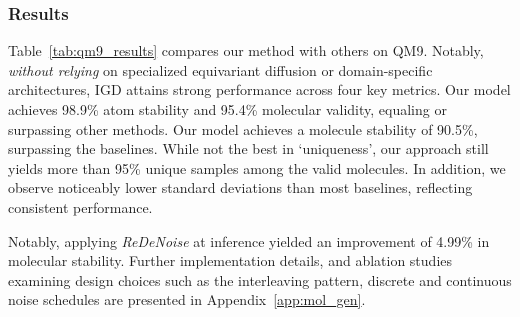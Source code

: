 \subsubsection{Results}
Table~\ref{tab:qm9_results} compares our method with others on QM9. Notably, \emph{without relying} on specialized equivariant diffusion or domain-specific architectures, IGD attains strong performance across four key metrics. Our model achieves 98.9\% atom stability and 95.4\% molecular validity, equaling or surpassing other methods. Our model achieves a molecule stability of 90.5\%, surpassing the baselines. While not the best in `uniqueness', our approach still yields more than 95\% unique samples among the valid molecules. In addition, we observe noticeably lower standard deviations than most baselines, reflecting consistent performance.

Notably, applying \emph{ReDeNoise} at inference yielded an improvement of 4.99\% in molecular stability. Further implementation details, and ablation studies examining design choices such as the interleaving pattern, discrete and continuous noise schedules are presented in Appendix~\ref{app:mol_gen}.


 \begin{table}[t]
     \vspace{-8pt}
    \caption{\textbf{Molecule Generation:} Quantitative results on QM9 benchmark.
    We report mean (standard deviation) across 3 runs, each with 10K generated samples. Refer to section \ref{par:mol_gen_eval_metrics} for details on evaluation metrics.}
    \label{tab:qm9_results}
     \vspace{-15pt}
  \end{table}